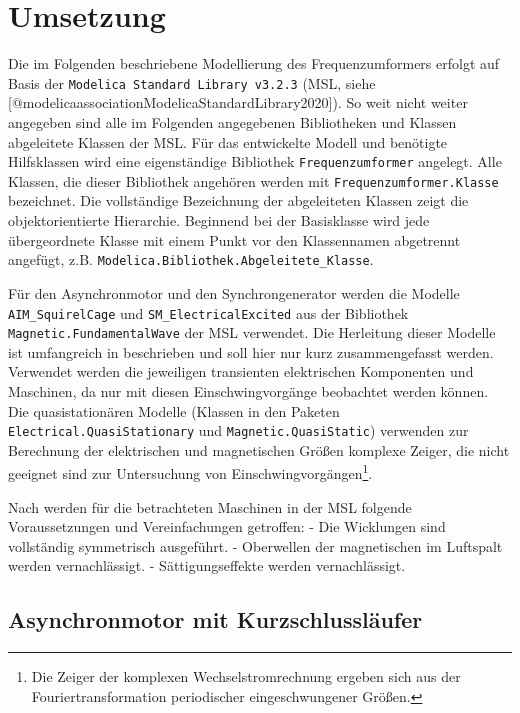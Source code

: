 \hypertarget{umsetzung}{%
\section{Umsetzung}\label{umsetzung}}

Die im Folgenden beschriebene Modellierung des Frequenzumformers erfolgt
auf Basis der \texttt{Modelica\ Standard\ Library\ v3.2.3} (MSL, siehe
{[}@modelicaassociationModelicaStandardLibrary2020{]}). So weit nicht
weiter angegeben sind alle im Folgenden angegebenen Bibliotheken und
Klassen abgeleitete Klassen der MSL. Für das entwickelte Modell und
benötigte Hilfsklassen wird eine eigenständige Bibliothek
\texttt{Frequenzumformer} angelegt. Alle Klassen, die dieser Bibliothek
angehören werden mit \texttt{Frequenzumformer.Klasse} bezeichnet. Die
vollständige Bezeichnung der abgeleiteten Klassen zeigt die
objektorientierte Hierarchie. Beginnend bei der Basisklasse wird jede
übergeordnete Klasse mit einem Punkt vor den Klassennamen abgetrennt
angefügt, z.B. \texttt{Modelica.Bibliothek.Abgeleitete\_Klasse}.

Für den Asynchronmotor und den Synchrongenerator werden die Modelle
\texttt{AIM\_SquirelCage} und \texttt{SM\_ElectricalExcited} aus der
Bibliothek \texttt{Magnetic.FundamentalWave} der MSL verwendet. Die
Herleitung dieser Modelle ist umfangreich in
\cite[]{kralModelicaObjektorientierteModellbildung2019} beschrieben und
soll hier nur kurz zusammengefasst werden. Verwendet werden die
jeweiligen transienten elektrischen Komponenten und Maschinen, da nur
mit diesen Einschwingvorgänge beobachtet werden können. Die
quasistationären Modelle (Klassen in den Paketen
\texttt{Electrical.QuasiStationary} und \texttt{Magnetic.QuasiStatic})
verwenden zur Berechnung der elektrischen und magnetischen Größen
komplexe Zeiger, die nicht geeignet sind zur Untersuchung von
Einschwingvorgängen\footnote{Die Zeiger der komplexen
  Wechselstromrechnung ergeben sich aus der Fouriertransformation
  periodischer eingeschwungener Größen.}.

Nach \cite[S. 149]{kralModelicaObjektorientierteModellbildung2019}
werden für die betrachteten Maschinen in der MSL folgende
Voraussetzungen und Vereinfachungen getroffen: - Die Wicklungen sind
vollständig symmetrisch ausgeführt. - Oberwellen der magnetischen im
Luftspalt werden vernachlässigt. - Sättigungseffekte werden
vernachlässigt.

\hypertarget{asynchronmotor-mit-kurzschlussluxe4ufer}{%
\subsection{Asynchronmotor mit
Kurzschlussläufer}\label{asynchronmotor-mit-kurzschlussluxe4ufer}}


